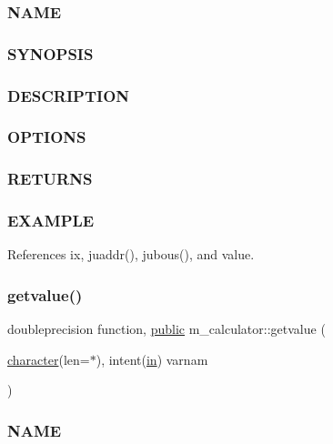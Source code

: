 \subsubsection*{N\+A\+ME}

\subsubsection*{S\+Y\+N\+O\+P\+S\+IS}

\subsubsection*{D\+E\+S\+C\+R\+I\+P\+T\+I\+ON}

\subsubsection*{O\+P\+T\+I\+O\+NS}

\subsubsection*{R\+E\+T\+U\+R\+NS}

\subsubsection*{E\+X\+A\+M\+P\+LE}

References ix, juaddr(), jubous(), and value.

\mbox{\label{namespacem__calculator_ab8fa4f20b1e4db1b10ed4deb52b89b34}} 
\subsubsection{\texorpdfstring{getvalue()}{getvalue()}}
{\footnotesize\ttfamily doubleprecision function, \hyperlink{M__stopwatch_83_8txt_a2f74811300c361e53b430611a7d1769f}{public} m\+\_\+calculator\+::getvalue (\begin{DoxyParamCaption}\item[{\hyperlink{option__stopwatch_83_8txt_abd4b21fbbd175834027b5224bfe97e66}{character}(len=$\ast$), intent(\hyperlink{M__journal_83_8txt_afce72651d1eed785a2132bee863b2f38}{in})}]{varnam }\end{DoxyParamCaption})}



\subsubsection*{N\+A\+ME}

